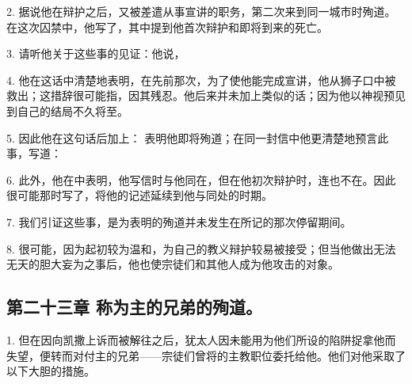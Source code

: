 2. 据说他在辩护之后，又被差遣从事宣讲的职务，第二次来到同一城市时殉道。在这次囚禁中，他写了，其中提到他首次辩护和即将到来的死亡。\par

3. 请听他关于这些事的见证：他说， \par

4. 他在这话中清楚地表明，在先前那次，为了使他能完成宣讲，他从狮子口中被救出；这措辞很可能指，因其残忍。他后来并未加上类似的话；因为他以神视预见到自己的结局不久将至。\par

5. 因此他在这句话后加上：  表明他即将殉道；在同一封信中他更清楚地预言此事，写道：\par

6. 此外，他在中表明，他写信时与他同在，但在他初次辩护时，连也不在。因此很可能那时写了，将他的记述延续到他与同处的时期。\par

7. 我们引证这些事，是为表明的殉道并未发生在所记的那次停留期间。\par

8. 很可能，因为起初较为温和，为自己的教义辩护较易被接受；但当他做出无法无天的胆大妄为之事后，他也使宗徒们和其他人成为他攻击的对象。\par


\subsection{第二十三章 称为主的兄弟的殉道。}

1. 但在因向凯撒上诉而被解往之后，犹太人因未能用为他们所设的陷阱捉拿他而失望，便转而对付主的兄弟——宗徒们曾将的主教职位委托给他。他们对他采取了以下大胆的措施。\par


